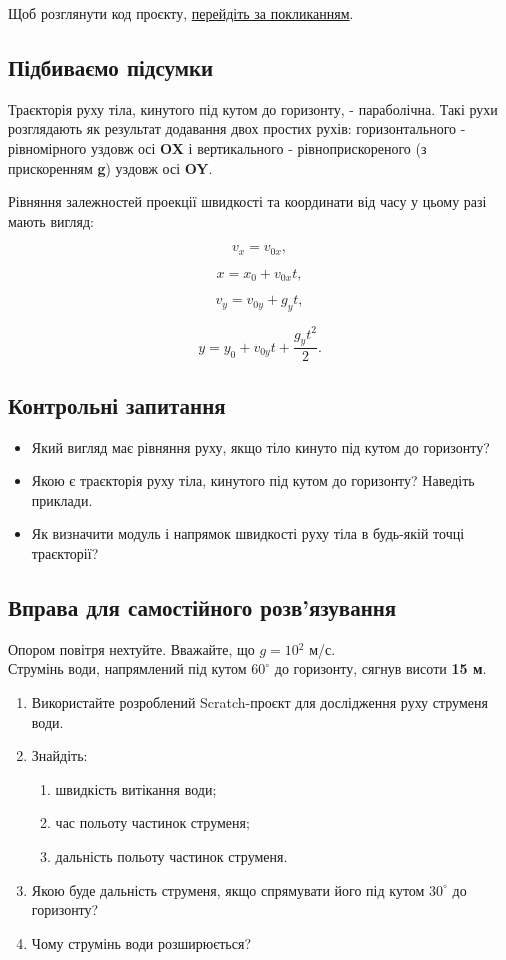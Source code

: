 Щоб розглянути код проєкту, \href{https://scratch.mit.edu/projects/681697866}{перейдіть за покликанням}. 

\subsection{Підбиваємо підсумки}

Траєкторія руху тіла, кинутого під кутом до горизонту, - параболічна. Такі рухи розглядають як результат додавання двох простих рухів: горизонтального - рівномірного уздовж осі \textbf{OX} і вертикального - рівноприскореного (з прискоренням \textbf{g}) уздовж осі \textbf{OY}. 

Рівняння залежностей проекції швидкості та координати від часу у цьому разі мають вигляд:

$$
	v_x = v_{0x}, 
$$

$$
	x = x_0 + v_{0x}t,
$$

$$
	v_y = v_{0y} + g_yt, 
$$

$$
	y = y_0 + v_{0y}t + \dfrac{g_yt^2}{2}.
$$

\subsection{Контрольні запитання}

\begin{itemize}
	\item Який вигляд має рівняння руху, якщо тіло кинуто під кутом до горизонту?
	\item Якою є траєкторія руху тіла, кинутого під кутом до горизонту? Наведіть приклади.
	\item Як визначити модуль і напрямок швидкості руху тіла в будь-якій точці траєкторії?
\end{itemize}

\subsection{Вправа для самостійного розв'язування}

Опором повітря нехтуйте. Вважайте, що $g = 10 {}^2$ %
{м/с}.\\

Струмінь води, напрямлений під кутом \textbf{$60^{\circ}$} до горизонту, сягнув висоти \textbf{15 м}.

\begin{enumerate}
	\item Використайте розроблений Scratch-проєкт для дослідження руху струменя води.
	\item Знайдіть: 
	\begin{enumerate}
		\item швидкість витікання води; 
		\item час польоту частинок струменя; 
		\item дальність польоту частинок струменя.
	\end{enumerate}
	\item Якою буде дальність струменя, якщо спрямувати його під кутом \textbf{$30^{\circ}$} до горизонту?
	\item Чому струмінь води розширюється?	
\end{enumerate}
